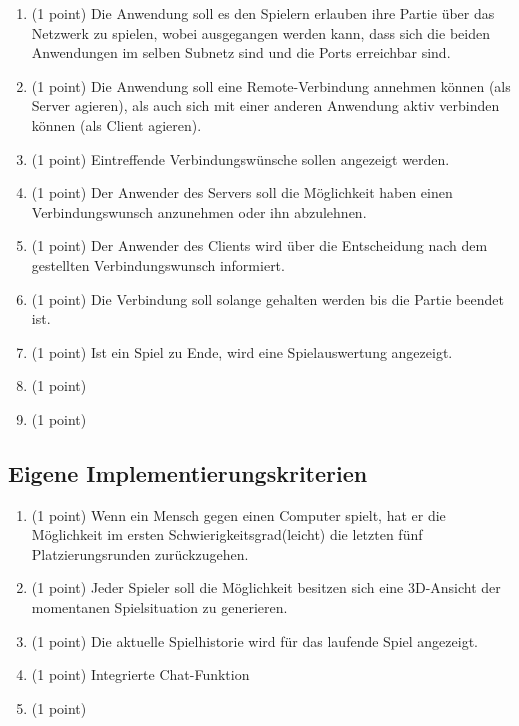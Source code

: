\documentclass[a4paper]{scrartcl}
\begin{document}
\begin{enumerate}
		\item (1 point) Die Anwendung soll es den Spielern erlauben ihre Partie über das Netzwerk zu spielen, wobei ausgegangen werden kann, dass sich die beiden Anwendungen im selben Subnetz sind und die Ports erreichbar sind.
		\item (1 point) Die Anwendung soll eine Remote-Verbindung annehmen können (als Server agieren), als auch sich mit einer anderen Anwendung aktiv verbinden können (als Client agieren).
		\item (1 point) Eintreffende Verbindungswünsche sollen angezeigt werden.
		\item (1 point) Der Anwender des Servers soll die Möglichkeit haben einen Verbindungswunsch anzunehmen oder ihn abzulehnen.
		\item (1 point) Der Anwender des Clients wird über die Entscheidung nach dem gestellten Verbindungswunsch informiert.
		\item (1 point) Die Verbindung soll solange gehalten werden bis die Partie beendet ist.
		\item (1 point) Ist ein Spiel zu Ende, wird eine Spielauswertung angezeigt.
		\item (1 point) 
		\item (1 point)
	\end{enumerate}
		
\subsection{Eigene Implementierungskriterien}
	\begin{enumerate}
		\item (1 point) Wenn ein Mensch gegen einen Computer spielt, hat er die Möglichkeit im ersten Schwierigkeitsgrad(leicht) die letzten fünf Platzierungsrunden zurückzugehen.
		\item (1 point) Jeder Spieler soll die Möglichkeit besitzen sich eine 3D-Ansicht der momentanen Spielsituation zu generieren.
		\item (1 point) Die aktuelle Spielhistorie wird für das laufende Spiel angezeigt.
		\item (1 point) Integrierte Chat-Funktion 
		\item (1 point) 
	\end{enumerate}
\end{document}
